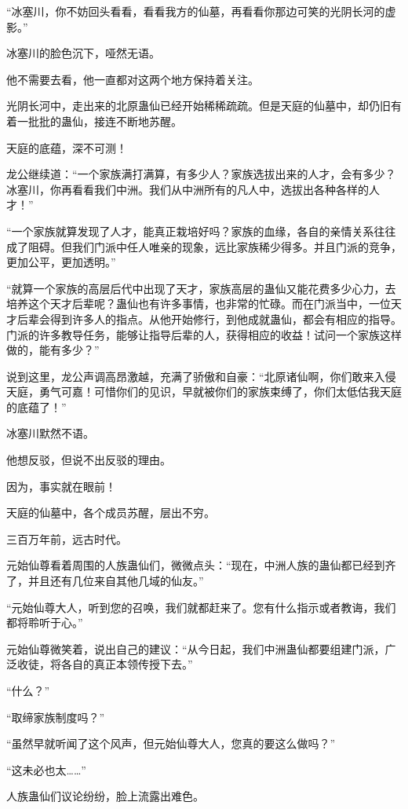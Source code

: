 \begin{this_body}
“冰塞川，你不妨回头看看，看看我方的仙墓，再看看你那边可笑的光阴长河的虚影。”

冰塞川的脸色沉下，哑然无语。

他不需要去看，他一直都对这两个地方保持着关注。

光阴长河中，走出来的北原蛊仙已经开始稀稀疏疏。但是天庭的仙墓中，却仍旧有着一批批的蛊仙，接连不断地苏醒。

天庭的底蕴，深不可测！

龙公继续道：“一个家族满打满算，有多少人？家族选拔出来的人才，会有多少？冰塞川，你再看看我们中洲。我们从中洲所有的凡人中，选拔出各种各样的人才！”

“一个家族就算发现了人才，能真正栽培好吗？家族的血缘，各自的亲情关系往往成了阻碍。但我们门派中任人唯亲的现象，远比家族稀少得多。并且门派的竞争，更加公平，更加透明。”

“就算一个家族的高层后代中出现了天才，家族高层的蛊仙又能花费多少心力，去培养这个天才后辈呢？蛊仙也有许多事情，也非常的忙碌。而在门派当中，一位天才后辈会得到许多人的指点。从他开始修行，到他成就蛊仙，都会有相应的指导。门派的许多教导任务，能够让指导后辈的人，获得相应的收益！试问一个家族这样做的，能有多少？”

说到这里，龙公声调高昂激越，充满了骄傲和自豪：“北原诸仙啊，你们敢来入侵天庭，勇气可嘉！可惜你们的见识，早就被你们的家族束缚了，你们太低估我天庭的底蕴了！”

冰塞川默然不语。

他想反驳，但说不出反驳的理由。

因为，事实就在眼前！

天庭的仙墓中，各个成员苏醒，层出不穷。

三百万年前，远古时代。

元始仙尊看着周围的人族蛊仙们，微微点头：“现在，中洲人族的蛊仙都已经到齐了，并且还有几位来自其他几域的仙友。”

“元始仙尊大人，听到您的召唤，我们就都赶来了。您有什么指示或者教诲，我们都将聆听于心。”

元始仙尊微笑着，说出自己的建议：“从今日起，我们中洲蛊仙都要组建门派，广泛收徒，将各自的真正本领传授下去。”

“什么？”

“取缔家族制度吗？”

“虽然早就听闻了这个风声，但元始仙尊大人，您真的要这么做吗？”

“这未必也太……”

人族蛊仙们议论纷纷，脸上流露出难色。


\end{this_body}
